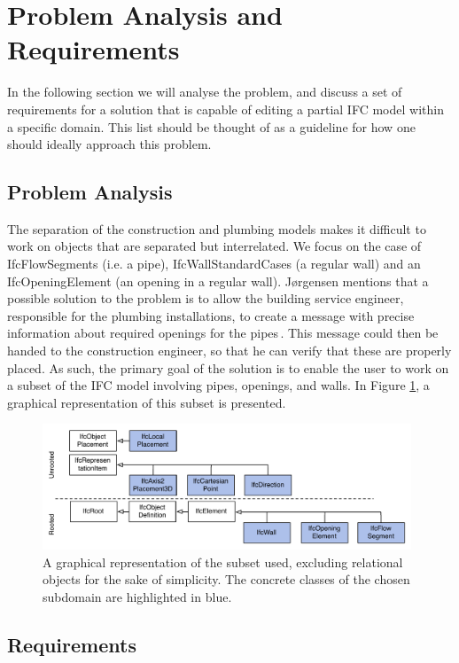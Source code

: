 \section{Problem Analysis and Requirements}
\label{sec:problem_analysis_and_requirements}
In the following section we will analyse the problem, and discuss a set of requirements for a solution that is capable of editing a partial IFC model within a specific domain. This list should be thought of as a guideline for how one should ideally approach this problem.

\subsection{Problem Analysis}
\label{subsec:problem_analysis}
The separation of the construction and plumbing models makes it difficult to work on objects that are separated but interrelated. We focus on the case of IfcFlowSegments (i.e. a pipe), IfcWallStandardCases (a regular wall) and an IfcOpeningElement (an opening in a regular wall). Jørgensen mentions that a possible solution to the problem is to allow the building service engineer, responsible for the plumbing installations, to create a message with precise information about required openings for the pipes\,\cite{jorgensen12}. This message could then be handed to the construction engineer, so that he can verify that these are properly placed. As such, the primary goal of the solution is to enable the user to work on a subset of the IFC model involving pipes, openings, and walls. In Figure \ref{fig:ifcheirachy}, a graphical representation of this subset is presented.

\begin{figure}[t]
    \centering
        \includegraphics[width=110mm]{images/IfcHeirachy.pdf}
    \caption{A graphical representation of the subset used, excluding relational objects for the sake of simplicity. The concrete classes of the chosen subdomain are highlighted in blue.}
    \label{fig:ifcheirachy}
\end{figure}

\subsection{Requirements}
\label{subsec:requirements}
